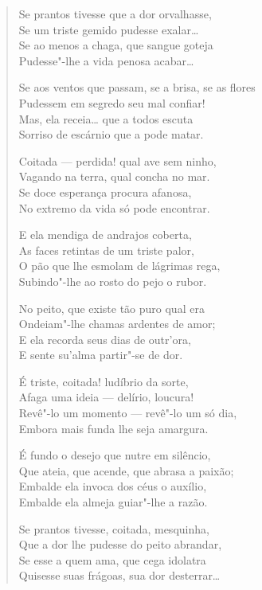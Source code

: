 \begin{verse}
Se prantos tivesse que a dor orvalhasse,\\
Se um triste gemido pudesse exalar\ldots{}\\
Se ao menos a chaga, que sangue goteja\\
Pudesse"-lhe a vida penosa acabar\ldots{}

Se aos ventos que passam, se a brisa, se as flores\\
Pudessem em segredo seu mal confiar!\\
Mas, ela receia\ldots{} que a todos escuta\\
Sorriso de escárnio que a pode matar.

Coitada --- perdida! qual ave sem ninho,\\
Vagando na terra, qual concha no mar.\\
Se doce esperança procura afanosa,\\
No extremo da vida só pode encontrar.

E ela mendiga de andrajos coberta,\\
As faces retintas de um triste palor,\\
O pão que lhe esmolam de lágrimas rega,\\
Subindo"-lhe ao rosto do pejo o rubor.

No peito, que existe tão puro qual era\\
Ondeiam"-lhe chamas ardentes de amor;\\
E ela recorda seus dias de outr'ora,\\
E sente su'alma partir"-se de dor.

É triste, coitada! ludíbrio da sorte,\\
Afaga uma ideia --- delírio, loucura!\\
Revê"-lo um momento --- revê"-lo um só dia,\\
Embora mais funda lhe seja amargura.

É fundo o desejo que nutre em silêncio,\\
Que ateia, que acende, que abrasa a paixão;\\
Embalde ela invoca dos céus o auxílio,\\
Embalde ela almeja guiar"-lhe a razão.

Se prantos tivesse, coitada, mesquinha,\\
Que a dor lhe pudesse do peito abrandar,\\
Se esse a quem ama, que cega idolatra\\
Quisesse suas frágoas, sua dor desterrar\ldots{}


\end{verse}
